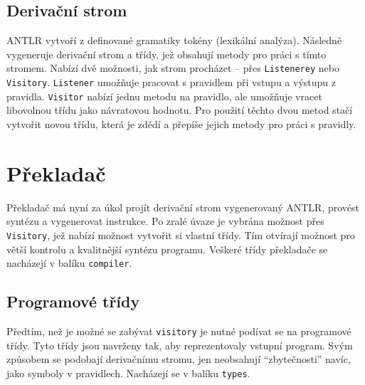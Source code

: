 \documentclass[
12pt,
a4paper,
pdftex,
czech,
titlepage
]{report}
\begin{document}
\subsection{Derivační strom}
 
ANTLR vytvoří z definované gramatiky tokény (lexikální analýza). Následně vygeneruje derivační strom a třídy, jež obsahují metody pro práci s tímto stromem. Nabízí dvě možnosti, jak strom procházet -- přes \texttt{Listenerey} nebo \texttt{Visitory}. \texttt{Listener} umožňuje pracovat s pravidlem při vstupu a výstupu z pravidla. \texttt{Visitor} nabízí jednu metodu na pravidlo, ale umožňuje vracet libovolnou třídu jako návratovou hodnotu. Pro použití těchto dvou metod stačí vytvořit novou třídu, která je zdědí a přepíše jejich metody pro práci s pravidly.
 
\section{Překladač}
 
Překladač má nyní za úkol projít derivační strom vygenerovaný ANTLR, provést syntézu a vygenerovat instrukce. Po zralé úvaze je vybrána možnost přes \texttt{Visitory}, jež nabízí možnost vytvořit si vlastní třídy. Tím otvírají možnost pro větší kontrolu a kvalitnější syntézu programu. Veškeré třídy překladače se nacházejí v balíku \texttt{compiler}.
 
\subsection{Programové třídy}
Předtím, než je možné se zabývat \texttt{visitory} je nutné podívat se na programové třídy. Tyto třídy jsou navrženy tak, aby reprezentovaly vstupní program. Svým způsobem se podobají derivačnímu stromu, jen neobsahují ``zbytečnosti'' navíc, jako symboly v pravidlech. Nacházejí se v balíku \texttt{types}. 
 
\end{document}
